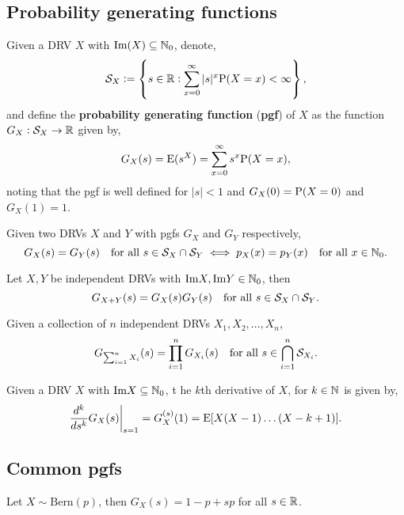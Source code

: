 \subsection{Probability generating functions}
\begin{definition}
    Given a DRV $X$ with $\text{Im}(X)\subseteq\NN_0$, denote, \[
        \SSS_X := \left\{s\in\RR:  \sum_{x=0}^\infty|s|^x\P(X=x)<\infty\right\}
        \textcolor{black}{,}
    \]
    and define the \textbf{probability generating function} (\textbf{pgf}) of $X$ as the function $G_X:\SSS_X\rightarrow\RR$ given by, \[
        G_X(s) = \E(s^X)=\sum_{x=0}^\infty s^x\P(X=x)\textcolor{black}{,}
    \]
    noting that the pgf is well defined for $|s|<1$ and $G_X(0)=\P(X=0)$ and $G_X(1)=1$.
\end{definition}

\begingroup\belowdisplayskip=-10pt

\begin{theorem}
    Given two DRVs $X$ and $Y$ with pgfs $G_X$ and $G_Y$ respectively, 
    \[G_X(s)=G_Y(s) \quad\text{\textcolor{black}{for all }}s\in \SSS_X\cap\SSS_Y \iff
    p_X(x)=p_Y(x) \quad\text{\textcolor{black}{for all }}x\in\NN_0
    \textcolor{black}{.}
    \]
\end{theorem}

\begin{theorem}
    Let $X,Y$ be independent DRVs with $\text{Im}X,\text{Im}Y\in\NN_0$, then \[
    G_{X+Y}(s)=G_X(s)G_Y(s) \quad
    \text{\textcolor{black}{ for all }}s\in\SSS_X\cap\SSS_Y\textcolor{black}{.}
    \]
\end{theorem}
\endgroup
\begingroup\belowdisplayskip=-0pt
\begin{theorem}
    Given a collection of $n$ independent DRVs $X_1,X_2,\ldots,X_n$, \[
        G_{\sum_{i=1}^nX_i}(s)=\prod_{i=1}^nG_{X_i}(s)\quad
        \text{\textcolor{black}{ for all }}s\in\bigcap_{i=1}^n\SSS_{X_i}\textcolor{black}{.}
    \]
\end{theorem}
\endgroup
\begingroup\belowdisplayskip=-10pt
\begin{theorem}[Moments]
    Given a DRV $X$ with $\text{Im}X\subseteq\NN_0$, t he $k$th derivative of $X$, for $k\in\NN$ is given by, \[
        \frac{d^k}{ds^k}G_X(s)\bigg|_{s=1}
        =G_X^{(s)}(1)=\E[X(X-1)\ldots(X-k+1)]
        \textcolor{black}{.}
    \]
\end{theorem}
\endgroup

\subsection{Common pgfs}
\begin{example}
    Let $X\sim\text{Bern}(p)$, then $G_X(s) = 1-p + sp$ for all $s\in\RR$.
\end{example}

